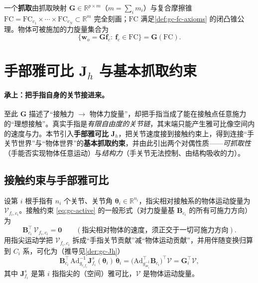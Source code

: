 \begin{definition}[抓取的代数描述]
\label{def:gc-grasp}
一个\textbf{抓取}由抓取映射 $\mathbf{G}\in\mathbb{R}^{p\times m}$（$m=\sum_i m_i$）与复合摩擦锥 $\mathrm{FC}=\mathrm{FC}_{c_1}\times\cdots\times\mathrm{FC}_{c_N}\subset\mathbb{R}^m$ 完全刻画；$\mathrm{FC}$ 满足\cref{def:gc-fc-axioms} 的闭凸锥公理。物体可被施加的力旋量集合为
\begin{equation}
  \{\mathbf{w}_o=\mathbf{G}\mathbf{f}_c:\ \mathbf{f}_c\in\mathrm{FC}\}=\mathbf{G}(\mathrm{FC}).
  \label{eq:gc-G-FC}
\end{equation}
\end{definition}

\section{手部雅可比 \texorpdfstring{$\mathbf{J}_h$}{Jh} 与基本抓取约束}
\label{sec:gc-handjac}

\paragraph{承上：把手指自身的关节接进来。}
至此 $\mathbf{G}$ 描述了“接触力 $\to$ 物体力旋量”，却把手指当成了能在接触点任意施力的“理想接触”。真实手指是\emph{有限自由度的关节链}，其末端只能产生雅可比像空间内的速度与力。本节引入\textbf{手部雅可比} $\mathbf{J}_h$，把关节速度接到接触约束上，得到连接“手关节世界”与“物体世界”的\textbf{基本抓取约束}，并由此引出两个对偶性质——\emph{可抓取性}（手能否实现物体任意运动）与\emph{结构力}（手关节无法控制、由结构吸收的力）。

\subsection{接触约束与手部雅可比}
\label{sec:gc-Jh-derive}

设第 $i$ 根手指有 $n_i$ 个关节、关节角 $\boldsymbol{\theta}_i\in\mathbb{R}^{n_i}$，指尖相对接触系的物体运动旋量为 $\mathcal{V}_{f_i,c_i}$。接触约束 \cref{eq:gc-active} 的一般形式（对力旋量基 $\mathbf{B}_{c_i}$ 的所有可施力方向）为\cite{murray1994mathematical}
\begin{equation}
  \mathbf{B}_{c_i}^\top\,\mathcal{V}_{f_i,c_i}=\mathbf{0}
  \qquad(\text{指尖相对物体的速度，须正交于一切可施力方向}).
  \label{eq:gc-contact-constraint}
\end{equation}
用指尖运动学把 $\mathcal{V}_{f_i,c_i}$ 拆成“手指关节贡献”减“物体运动贡献”，并用伴随变换归算到 $C_i$ 系，可化为（推导见\cref{der:gc-Jh}）
\begin{equation}
  \mathbf{B}_{c_i}^\top\,\mathrm{Ad}_{g_{c_if_i}}^{-1}\mathbf{J}^{s}_{f_i}(\boldsymbol{\theta}_i)\,\dot{\boldsymbol{\theta}}_i
  =\big(\mathrm{Ad}_{g_{oc_i}^{-1}}^\top\mathbf{B}_{c_i}\big)^\top\mathcal{V}
  =\mathbf{G}_i^\top\mathcal{V},
  \label{eq:gc-contact-row}
\end{equation}
其中 $\mathbf{J}^{s}_{f_i}$ 是第 $i$ 指指尖的（空间）雅可比，$\mathcal{V}$ 是物体运动旋量。

